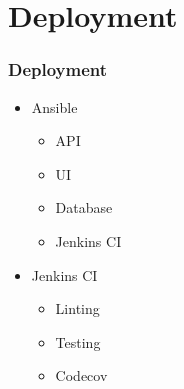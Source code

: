 \documentclass[12pt]{beamer}
\begin{document}
	\section{Deployment}
	\begin{frame}
		\frametitle{Deployment}
		\begin{itemize}
			\item Ansible
			\begin{itemize}
                \item API
                \item UI
                \item Database
                \item Jenkins CI
            \end{itemize} 
			\item Jenkins CI
            \begin{itemize}
                \item Linting
                \item Testing
                \item Codecov
            \end{itemize}
		\end{itemize}
    \end{frame}
\end{document}
